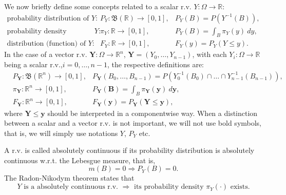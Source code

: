 We now briefly define some concepts related to a scalar r.v. $Y:\Omega\rightarrow\mathbb{R}$:
\begin{eqnarray*}
\text{probability distribution of }                      Y: & P_Y:  \mathfrak{B}(\mathbb{R})\rightarrow [0,1], & P_Y(B) = P(Y^{-1}(B)),       \\
\text{probability density (function), if it exists, of } Y: & \pi_Y:             \mathbb{R} \rightarrow [0,1], & P_Y(B) = \int_B \pi_Y(y)~dy, \\
\text{distribution (function) of }                       Y: & F_Y:               \mathbb{R} \rightarrow [0,1], & F_Y(y) = P_Y(Y\leqslant y).
\end{eqnarray*}
In the case of a vector r.v. $\mathbf{Y}:\Omega\rightarrow\mathbb{R}^n$, $\mathbf{Y}=(Y_0,\ldots,Y_{n-1})$,
with each $Y_i:\Omega\rightarrow\mathbb{R}$ being a scalar r.v.,$i=0,\ldots,n-1$, the respective definitions are:
\begin{eqnarray*}
 & P_{\mathbf{Y}}:  \mathfrak{B}(\mathbb{R}^n)\rightarrow [0,1], & P_{\mathbf{Y}}(B_0,\ldots,B_{n-1}) = P(Y_0^{-1}(B_0)\cap\ldots\cap Y_{n-1}^{-1}(B_{n-1})), \\
 & \pi_{\mathbf{Y}}:             \mathbb{R}^n \rightarrow [0,1], & P_{\mathbf{Y}}(\mathbf{B}) = \int_B \pi_{\mathbf{Y}}(\mathbf{y})~d\mathbf{y}, \\
 & F_{\mathbf{Y}}:               \mathbb{R}^n \rightarrow [0,1], & F_{\mathbf{Y}}(\mathbf{y}) = P_{\mathbf{Y}}(\mathbf{Y}\leqslant\mathbf{y}),
\end{eqnarray*}
where $\mathbf{Y}\leqslant\mathbf{y}$ should be interpreted in a componentwise way.
When a distinction between a scalar and a vector r.v. is not important, we will not use bold symbols, that is, we will simply use notations $Y$, $P_Y$ etc.

A r.v. is called absolutely continuous if its probability distribution is absolutely continuous w.r.t. the Lebesgue measure, that is,
\begin{equation*}
m(B) = 0 \Rightarrow P_Y(B) = 0.
\end{equation*}
The Radon-Nikodym theorem \cite{KaSo05} states that
\begin{equation}\label{eq-radon-nik}
Y\text{ is a absolutely continuous r.v. }\Rightarrow\text{ its probability density }\pi_Y(\cdot)\text{ exists}.
\end{equation}


